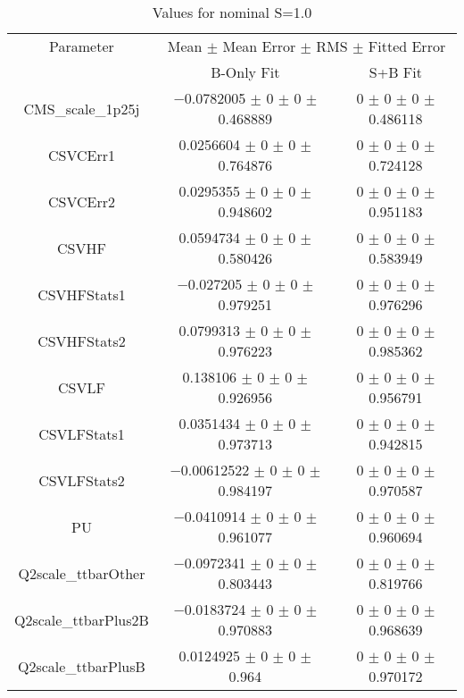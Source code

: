 \begin{table}
\centering
\caption{Values for nominal S=1.0}
\begin{tabular}{ccc}
\toprule
Parameter & \multicolumn{2}{c}{Mean $\pm$ Mean Error $\pm$ RMS $\pm$ Fitted Error}\\
 & B-Only Fit & S+B Fit\\
\midrule
CMS\_scale\_1p25j & \num{-0.0782005} $\pm$ \num{0} $\pm$ \num{0} $\pm$ \num{0.468889} & \num{0} $\pm$ \num{0} $\pm$ \num{0} $\pm$ \num{0.486118}\\
CSVCErr1 & \num{0.0256604} $\pm$ \num{0} $\pm$ \num{0} $\pm$ \num{0.764876} & \num{0} $\pm$ \num{0} $\pm$ \num{0} $\pm$ \num{0.724128}\\
CSVCErr2 & \num{0.0295355} $\pm$ \num{0} $\pm$ \num{0} $\pm$ \num{0.948602} & \num{0} $\pm$ \num{0} $\pm$ \num{0} $\pm$ \num{0.951183}\\
CSVHF & \num{0.0594734} $\pm$ \num{0} $\pm$ \num{0} $\pm$ \num{0.580426} & \num{0} $\pm$ \num{0} $\pm$ \num{0} $\pm$ \num{0.583949}\\
CSVHFStats1 & \num{-0.027205} $\pm$ \num{0} $\pm$ \num{0} $\pm$ \num{0.979251} & \num{0} $\pm$ \num{0} $\pm$ \num{0} $\pm$ \num{0.976296}\\
CSVHFStats2 & \num{0.0799313} $\pm$ \num{0} $\pm$ \num{0} $\pm$ \num{0.976223} & \num{0} $\pm$ \num{0} $\pm$ \num{0} $\pm$ \num{0.985362}\\
CSVLF & \num{0.138106} $\pm$ \num{0} $\pm$ \num{0} $\pm$ \num{0.926956} & \num{0} $\pm$ \num{0} $\pm$ \num{0} $\pm$ \num{0.956791}\\
CSVLFStats1 & \num{0.0351434} $\pm$ \num{0} $\pm$ \num{0} $\pm$ \num{0.973713} & \num{0} $\pm$ \num{0} $\pm$ \num{0} $\pm$ \num{0.942815}\\
CSVLFStats2 & \num{-0.00612522} $\pm$ \num{0} $\pm$ \num{0} $\pm$ \num{0.984197} & \num{0} $\pm$ \num{0} $\pm$ \num{0} $\pm$ \num{0.970587}\\
PU & \num{-0.0410914} $\pm$ \num{0} $\pm$ \num{0} $\pm$ \num{0.961077} & \num{0} $\pm$ \num{0} $\pm$ \num{0} $\pm$ \num{0.960694}\\
Q2scale\_ttbarOther & \num{-0.0972341} $\pm$ \num{0} $\pm$ \num{0} $\pm$ \num{0.803443} & \num{0} $\pm$ \num{0} $\pm$ \num{0} $\pm$ \num{0.819766}\\
Q2scale\_ttbarPlus2B & \num{-0.0183724} $\pm$ \num{0} $\pm$ \num{0} $\pm$ \num{0.970883} & \num{0} $\pm$ \num{0} $\pm$ \num{0} $\pm$ \num{0.968639}\\
Q2scale\_ttbarPlusB & \num{0.0124925} $\pm$ \num{0} $\pm$ \num{0} $\pm$ \num{0.964} & \num{0} $\pm$ \num{0} $\pm$ \num{0} $\pm$ \num{0.970172}\\

\end{tabular}
\end{table}
